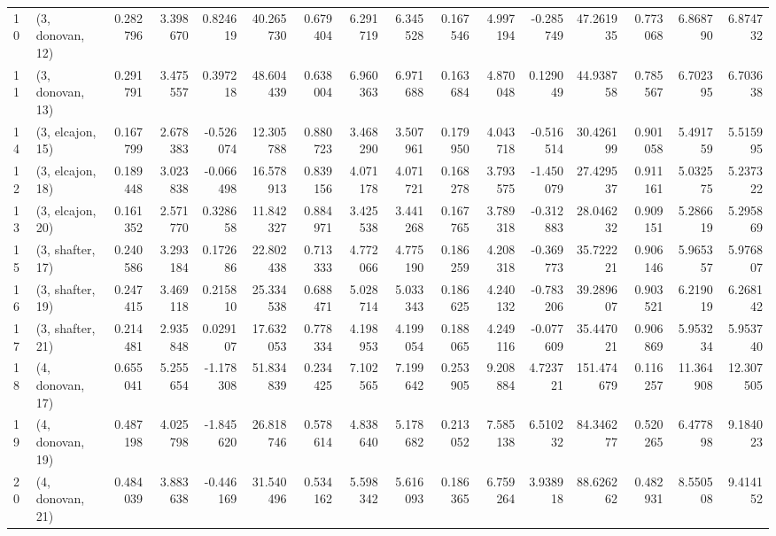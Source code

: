 \begin{tabular}{llrrrrrrrrrrrrrr}
10 &  (3, donovan, 12) &   0.282796 &  3.398670 &  0.824619 &   40.265730 &  0.679404 &   6.291719 &   6.345528 &  0.167546 &   4.997194 & -0.285749 &   47.261935 &  0.773068 &   6.868790 &   6.874732 \\
11 &  (3, donovan, 13) &   0.291791 &  3.475557 &  0.397218 &   48.604439 &  0.638004 &   6.960363 &   6.971688 &  0.163684 &   4.870048 &  0.129049 &   44.938758 &  0.785567 &   6.702395 &   6.703638 \\
14 &  (3, elcajon, 15) &   0.167799 &  2.678383 & -0.526074 &   12.305788 &  0.880723 &   3.468290 &   3.507961 &  0.179950 &   4.043718 & -0.516514 &   30.426199 &  0.901058 &   5.491759 &   5.515995 \\
12 &  (3, elcajon, 18) &   0.189448 &  3.023838 & -0.066498 &   16.578913 &  0.839156 &   4.071178 &   4.071721 &  0.168278 &   3.793575 & -1.450079 &   27.429537 &  0.911161 &   5.032575 &   5.237322 \\
13 &  (3, elcajon, 20) &   0.161352 &  2.571770 &  0.328658 &   11.842327 &  0.884971 &   3.425538 &   3.441268 &  0.167765 &   3.789318 & -0.312883 &   28.046232 &  0.909151 &   5.286619 &   5.295869 \\
15 &  (3, shafter, 17) &   0.240586 &  3.293184 &  0.172686 &   22.802438 &  0.713333 &   4.772066 &   4.775190 &  0.186259 &   4.208318 & -0.369773 &   35.722221 &  0.906146 &   5.965357 &   5.976807 \\
16 &  (3, shafter, 19) &   0.247415 &  3.469118 &  0.215810 &   25.334538 &  0.688471 &   5.028714 &   5.033343 &  0.186625 &   4.240132 & -0.783206 &   39.289607 &  0.903521 &   6.219019 &   6.268142 \\
17 &  (3, shafter, 21) &   0.214481 &  2.935848 &  0.029107 &   17.632053 &  0.778334 &   4.198953 &   4.199054 &  0.188065 &   4.249116 & -0.077609 &   35.447021 &  0.906869 &   5.953234 &   5.953740 \\
18 &  (4, donovan, 17) &   0.655041 &  5.255654 & -1.178308 &   51.834839 &  0.234425 &   7.102565 &   7.199642 &  0.253905 &   9.208884 &  4.723721 &  151.474679 &  0.116257 &  11.364908 &  12.307505 \\
19 &  (4, donovan, 19) &   0.487198 &  4.025798 & -1.845620 &   26.818746 &  0.578614 &   4.838640 &   5.178682 &  0.213052 &   7.585138 &  6.510232 &   84.346277 &  0.520265 &   6.477898 &   9.184023 \\
20 &  (4, donovan, 21) &   0.484039 &  3.883638 & -0.446169 &   31.540496 &  0.534162 &   5.598342 &   5.616093 &  0.186365 &   6.759264 &  3.938918 &   88.626262 &  0.482931 &   8.550508 &   9.414152 \\

\end{tabular}
